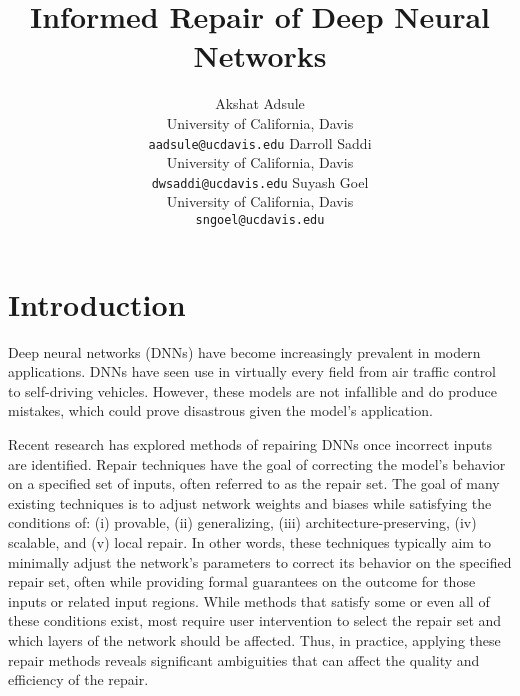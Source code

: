\documentclass{article}
\title{Informed Repair of Deep Neural Networks}
\begin{document}
\author{
    Akshat Adsule \\
    University of California, Davis \\
    \texttt{aadsule@ucdavis.edu}
    \And
    Darroll Saddi \\
    University of California, Davis \\
    \texttt{dwsaddi@ucdavis.edu}
    \And
    Suyash Goel \\
    University of California, Davis \\
    \texttt{sngoel@ucdavis.edu}
}

\maketitle


\section{Introduction}

Deep neural networks (DNNs) have become increasingly prevalent in modern applications.
DNNs have seen use in virtually every field from air traffic control to self-driving vehicles.
However, these models are not infallible and do produce mistakes, which could prove disastrous given the model's application.

Recent research \cite{nawas_provable_2024, sotoudeh_provable_2021, tao_architecture-preserving_2023} has explored methods of repairing DNNs once incorrect inputs are identified.
Repair techniques have the goal of correcting the model's behavior on a specified set of inputs, often referred to as the repair set.
The goal of many existing techniques is to adjust network weights and biases while satisfying the conditions of: (i) provable, (ii) generalizing, (iii) architecture-preserving, (iv) scalable, and (v) local repair.
In other words, these techniques typically aim to minimally adjust the network's parameters to correct its behavior on the specified repair set, often while providing formal guarantees on the outcome for those inputs or related input regions.
While methods that satisfy some or even all of these conditions exist, most require user intervention to select the repair set and which layers of the network should be affected.
Thus, in practice, applying these repair methods reveals significant ambiguities that can affect the quality and efficiency of the repair.
\end{document}
